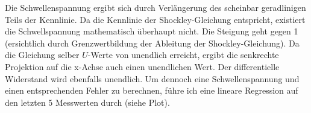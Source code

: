 \documentclass[a4paper,german,12pt,smallheadings]{scrartcl}
\begin{document}
Die Schwellenspannung ergibt sich durch Verlängerung des scheinbar geradlinigen
Teils der Kennlinie. Da die Kennlinie der Shockley-Gleichung entspricht,
existiert die Schwellspannung mathematisch überhaupt nicht. Die Steigung geht
gegen 1 (ersichtlich durch Grenzwertbildung der Ableitung der
Shockley-Gleichung). Da die Gleichung selber $U$-Werte von unendlich erreicht,
ergibt die senkrechte Projektion auf die x-Achse auch einen unendlichen Wert.
Der differentielle Widerstand wird ebenfalls unendlich. Um dennoch eine
Schwellenspannung und einen entsprechenden Fehler zu berechnen, führe ich eine
lineare Regression auf den letzten 5 Messwerten durch (siehe Plot).
\end{document}
